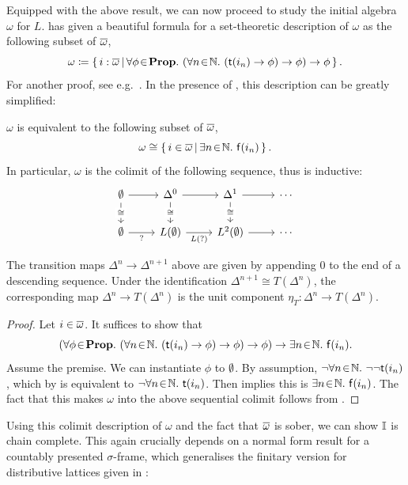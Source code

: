 Equipped with the above result, we can now proceed to study the initial algebra $\omega$ for $L$. \citet{JIBLADZE1997185} has given a beautiful formula for a set-theoretic description of $\omega$ as the following subset of $\overline{\omega}$, 
\[ \omega \coloneq \left\{\,i : \overline{\omega}\,\middle|\,\forall \phi\!\in\!\mathbf{Prop}.\  (\forall n\!\in\!\mathbb{N}.\  (\mathsf{t}(i_n) \to \phi) \to \phi) \to \phi\,\right\}\text{.} \]
For another proof, see e.g.~\citet{VANOOSTEN2000233}. In the presence of , this description can be greatly simplified:

\begin{proposition}[\AxiomNT, \AxiomSQCC]\label{prop:omegacolimit}
  $\omega$ is equivalent to the following subset of $\overline{\omega}$,
  \[ \omega \cong \left\{\,i \in \overline{\omega}\,\middle|\,\exists n\!\in\!\mathbb{N}.\  \mathsf{f}(i_n)\,\right\}\text{.} \]
  In particular, $\omega$ is the colimit of the following sequence, thus is inductive:
  \[\begin{tikzcd}
    \emp & {\Delta^0} & {\Delta^1} & \cdots \\
    \emp & {L(\emp)} & {L^2(\emp)} & \cdots
    \arrow[from=1-1, to=1-2]
    \arrow["\cong"{description}, from=1-1, to=2-1]
    \arrow[from=1-2, to=1-3]
    \arrow["\cong"{description}, from=1-2, to=2-2]
    \arrow[from=1-3, to=1-4]
    \arrow["\cong"{description}, from=1-3, to=2-3]
    \arrow["{?}"', from=2-1, to=2-2]
    \arrow["{L(?)}"', from=2-2, to=2-3]
    \arrow[from=2-3, to=2-4]
  \end{tikzcd}\]
\end{proposition}

The transition maps $\Delta^n\to \Delta^{n+1}$ above are given by appending $0$ to the end of a descending sequence. Under the identification $\Delta^{n+1}\cong T(\Delta^n)$, the corresponding map $\Delta^n\to T(\Delta^n)$ is the unit component $\eta_T\colon \Delta^n\to T(\Delta^{n})$.

\begin{proof}
  Let $i \in \overline{\omega}$. It suffices to show that
  \[ \left(\forall \phi\!\in\!\mathbf{Prop}.\  (\forall n\!\in\!\mathbb{N}.\  (\mathsf{t}(i_n) \to \phi) \to \phi) \to \phi\right) \to \exists n\!\in\!\mathbb{N}.\  \mathsf{f}(i_n)\text{.} \]
  Assume the premise. We can instantiate $\phi$ to $\emptyset$. By assumption, $\neg\forall n\!\in\!\mathbb{N}.\  \neg\neg\mathsf{t}(i_n)$, which by  is equivalent to $\neg\forall n\!\in\!\mathbb{N}.\  \mathsf{t}(i_n)$. Then  implies this is $\exists n\!\in\!\mathbb{N}.\  \mathsf{f}(i_n)$. The fact that this makes $\omega$ into the above sequential colimit follows from \citet[Cor.~1.10]{VANOOSTEN2000233}.
\end{proof}

Using this colimit description of $\omega$ and the fact that $\overline{\omega}$ is sober, we can show $\mathbb{I}$ is chain complete. This again crucially depends on a normal form result for a countably presented $\sigma$-frame, which generalises the finitary version for distributive lattices given in :

